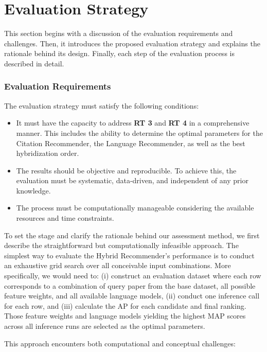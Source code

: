 \section{Evaluation Strategy} \label{sec:evaluation-strategy}

This section begins with a discussion of the evaluation requirements and challenges.
Then, it introduces the proposed evaluation strategy and explains the rationale behind its design.
Finally, each step of the evaluation process is described in detail.

\subsubsection*{Evaluation Requirements}

The evaluation strategy must satisfy the following conditions:

\begin{itemize}
    \item It must have the capacity to address \textbf{\ac{RT} 3} and \textbf{\ac{RT} 4} in a comprehensive manner.
          This includes the ability to determine the optimal parameters for the Citation Recommender, the Language Recommender, as well as the best hybridization order.
    \item The results should be objective and reproducible.
          To achieve this, the evaluation must be systematic, data-driven, and independent of any prior knowledge.
    \item The process must be computationally manageable considering the available resources and time constraints.
\end{itemize}

To set the stage and clarify the rationale behind our assessment method, we first describe the straightforward but computationally infeasible approach.
The simplest way to evaluate the Hybrid Recommender's performance is to conduct an exhaustive grid search over all conceivable input combinations.
More specifically, we would need to: (i) construct an evaluation dataset where each row corresponds to a combination of query paper from the base dataset, all possible feature weights, and all available language models, (ii) conduct one inference call for each row, and (iii) calculate the \ac{AP} for each candidate and final ranking.
Those feature weights and language models yielding the highest \ac{MAP} scores across all inference runs are selected as the optimal parameters.

This approach encounters both computational and conceptual challenges:

